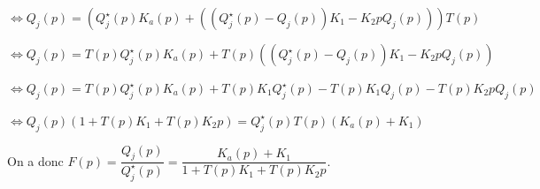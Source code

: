 \documentclass[10pt,fleqn]{article} %
\begin{document}

$\Leftrightarrow Q_j(p) = 
\left(
    Q_j^{\star}(p) K_a(p) + 
    \left( 
        \left(Q_j^{\star}(p) - Q_j(p) \right) K_1 - K_2 p Q_j(p) 
    \right)
\right) T(p)$

$\Leftrightarrow Q_j(p) = 
    T(p)Q_j^{\star}(p) K_a(p) + 
    T(p)\left( 
        \left(Q_j^{\star}(p) - Q_j(p) \right) K_1 - K_2 p Q_j(p) 
    \right) $

$\Leftrightarrow Q_j(p) = 
    T(p)Q_j^{\star}(p) K_a(p) + 
        T(p)K_1 Q_j^{\star}(p) -T(p)K_1  Q_j(p)   - T(p)K_2 p Q_j(p) 
     $

$\Leftrightarrow Q_j(p)\left(1     +T(p)K_1     + T(p)K_2 p\right)= 
      Q_j^{\star}(p)T(p) \left(  K_a(p)     +K_1 \right)     $

On a donc $F(p)=\dfrac{Q_j(p)}{Q_j^{\star}(p)}=\dfrac{ K_a(p) +K_1}{1+T(p)K_1 + T(p)K_2 p}$.
\end{document}
